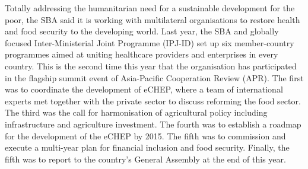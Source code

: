 \documentclass{article}
\begin{document}
Totally addressing the humanitarian need for a sustainable development for the poor, the SBA said it is working with multilateral organisations to restore health and food security to the developing world. Last year, the SBA and globally focused Inter-Ministerial Joint Programme (IPJ-ID) set up six member-country programmes aimed at uniting healthcare providers and enterprises in every country. This is the second time this year that the organisation has participated in the flagship summit event of Asia-Pacific Cooperation Review (APR). The first was to coordinate the development of eCHEP, where a team of international experts met together with the private sector to discuss reforming the food sector. The third was the call for harmonisation of agricultural policy including infrastructure and agriculture investment. The fourth was to establish a roadmap for the development of the eCHEP by 2015. The fifth was to commission and execute a multi-year plan for financial inclusion and food security. Finally, the fifth was to report to the country’s General Assembly at the end of this year.
\end{document}
